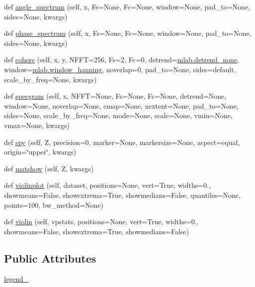\begin{DoxyCompactItemize}
\item 
def \hyperlink{classmatplotlib_1_1axes_1_1__axes_1_1Axes_a04ae4afb3fecfd6ad99e0d814c28a985}{angle\+\_\+spectrum} (self, x, Fs=None, Fc=None, window=None, pad\+\_\+to=None, sides=None, kwargs)
\item 
def \hyperlink{classmatplotlib_1_1axes_1_1__axes_1_1Axes_af24c675aa7c08386385a740044392443}{phase\+\_\+spectrum} (self, x, Fs=None, Fc=None, window=None, pad\+\_\+to=None, sides=None, kwargs)
\item 
def \hyperlink{classmatplotlib_1_1axes_1_1__axes_1_1Axes_a2afb0255d5390cca20abbd244fe3cea5}{cohere} (self, x, y, N\+F\+FT=256, Fs=2, Fc=0, detrend=\hyperlink{namespacematplotlib_1_1mlab_a359979aa8e0e635738648ca88ebd5e1d}{mlab.\+detrend\+\_\+none}, window=\hyperlink{namespacematplotlib_1_1mlab_a0be4c7ab27102a4d8ceb0a08a32ac0fc}{mlab.\+window\+\_\+hanning}, noverlap=0, pad\+\_\+to=None, sides=\textquotesingle{}default\textquotesingle{}, scale\+\_\+by\+\_\+freq=None, kwargs)
\item 
def \hyperlink{classmatplotlib_1_1axes_1_1__axes_1_1Axes_aea2e06c322ba7ec8e5eb38a804da418b}{specgram} (self, x, N\+F\+FT=None, Fs=None, Fc=None, detrend=None, window=None, noverlap=None, cmap=None, xextent=None, pad\+\_\+to=None, sides=None, scale\+\_\+by\+\_\+freq=None, mode=None, scale=None, vmin=None, vmax=None, kwargs)
\item 
def \hyperlink{classmatplotlib_1_1axes_1_1__axes_1_1Axes_a4e0fc4cdef20c3722fbc734f7ecd8cbf}{spy} (self, Z, precision=0, marker=None, markersize=None, aspect=\textquotesingle{}equal\textquotesingle{}, origin=\char`\"{}upper\char`\"{}, kwargs)
\item 
def \hyperlink{classmatplotlib_1_1axes_1_1__axes_1_1Axes_a420ee1a42368562ed2fca0eff0052514}{matshow} (self, Z, kwargs)
\item 
def \hyperlink{classmatplotlib_1_1axes_1_1__axes_1_1Axes_a16b0b53944961117e4850bee3b049a53}{violinplot} (self, dataset, positions=None, vert=True, widths=0., showmeans=False, showextrema=True, showmedians=False, quantiles=None, points=100, bw\+\_\+method=None)
\item 
def \hyperlink{classmatplotlib_1_1axes_1_1__axes_1_1Axes_a9581821dd9373be3e779d81442d2a206}{violin} (self, vpstats, positions=None, vert=True, widths=0., showmeans=False, showextrema=True, showmedians=False)
\end{DoxyCompactItemize}
\subsection*{Public Attributes}
\begin{DoxyCompactItemize}
\item 
\hyperlink{classmatplotlib_1_1axes_1_1__axes_1_1Axes_acb11c7815aeaa8917f2c99439b1c2137}{legend\+\_\+}
\end{DoxyCompactItemize}
